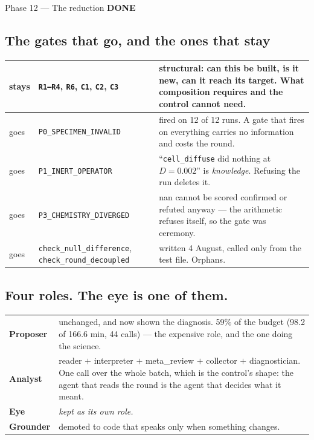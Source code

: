 \documentclass[11pt,a4paper]{article}
\newcommand{\code}[1]{\texttt{#1}}
\newcommand{\done}{\textcolor{good}{\textbf{DONE}}}
\begin{document}
\begin{phasebox}{Phase 12 --- The reduction \hfill \done}
\subsection*{The gates that go, and the ones that stay}
\begin{center}\small
\begin{tabular}{llp{6.2cm}}
\toprule
stays & \code{R1--R4}, \code{R6}, \code{C1}, \code{C2}, \code{C3} & structural: can this be built,
is it new, can it reach its target. What composition requires and the control cannot need. \\
\midrule
goes & \code{P0\_SPECIMEN\_INVALID} & fired on 12 of 12 runs. A gate that fires on everything
carries no information and costs the round. \\
goes & \code{P1\_INERT\_OPERATOR} & ``\code{cell\_diffuse} did nothing at $D=0.002$'' is
\emph{knowledge}. Refusing the run deletes it. \\
goes & \code{P3\_CHEMISTRY\_DIVERGED} & nan cannot be scored confirmed or refuted anyway --- the
arithmetic refuses itself, so the gate was ceremony. \\
goes & \code{check\_null\_difference}, \code{check\_round\_decoupled} & written 4 August, called
only from the test file. Orphans. \\
\bottomrule
\end{tabular}
\end{center}

\subsection*{Four roles. The eye is one of them.}
\begin{center}\small
\begin{tabular}{lp{7.4cm}}
\toprule
\textbf{Proposer} & unchanged, and now shown the diagnosis. 59\% of the budget
(98.2 of 166.6 min, 44 calls) --- the expensive role, and the one doing the science. \\
\textbf{Analyst}  & reader $+$ interpreter $+$ meta\_review $+$ collector $+$ diagnostician. One
call over the whole batch, which is the control's shape: the agent that reads the round is the agent
that decides what it meant. \\
\textbf{Eye}      & \emph{kept as its own role.} \\
\textbf{Grounder} & demoted to code that speaks only when something changes. \\
\bottomrule
\end{tabular}
\end{center}


\end{phasebox}
\end{document}
